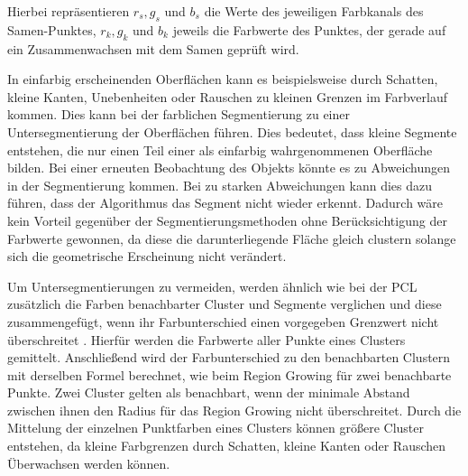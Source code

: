 Hierbei repräsentieren $r_s, g_s$ und $b_s$ die Werte des jeweiligen Farbkanals des Samen-Punktes, $r_k, g_k$ und $b_k$ jeweils die Farbwerte des Punktes, der gerade auf ein Zusammenwachsen mit dem Samen geprüft wird.

In einfarbig erscheinenden Oberflächen kann es beispielsweise durch Schatten, kleine Kanten, Unebenheiten oder Rauschen zu kleinen Grenzen im Farbverlauf kommen. Dies kann bei der farblichen Segmentierung zu einer Untersegmentierung der Oberflächen führen. Dies bedeutet, dass kleine Segmente entstehen, die nur einen Teil einer als einfarbig wahrgenommenen Oberfläche bilden. Bei einer erneuten Beobachtung des Objekts könnte es zu Abweichungen in der Segmentierung kommen. Bei zu starken Abweichungen kann dies dazu führen, dass der Algorithmus das Segment nicht wieder erkennt. Dadurch wäre kein Vorteil gegenüber der Segmentierungsmethoden ohne Berücksichtigung der Farbwerte gewonnen, da diese die darunterliegende Fläche gleich clustern solange sich die geometrische Erscheinung nicht verändert.

Um Untersegmentierungen zu vermeiden, werden ähnlich wie bei der PCL zusätzlich die Farben benachbarter Cluster und Segmente verglichen und diese zusammengefügt, wenn ihr Farbunterschied einen vorgegeben Grenzwert nicht überschreitet \cite{PCLCRG2020}. Hierfür werden die Farbwerte aller Punkte eines Clusters gemittelt. Anschließend wird der Farbunterschied zu den benachbarten Clustern mit derselben Formel berechnet, wie beim Region Growing für zwei benachbarte Punkte. Zwei Cluster gelten als benachbart, wenn der minimale Abstand zwischen ihnen den Radius für das Region Growing nicht überschreitet. Durch die Mittelung der einzelnen Punktfarben eines Clusters können größere Cluster entstehen, da kleine Farbgrenzen durch Schatten, kleine Kanten oder Rauschen Überwachsen werden können. 

